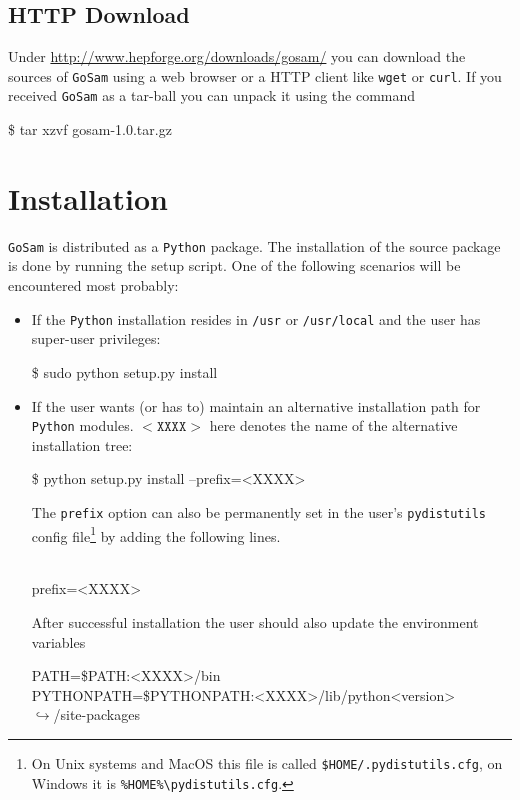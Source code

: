 \documentclass[11pt,a4paper]{refrep}
\newcommand{\golemversion}{{1{.}0}}
\newcommand{\golemv}[1][\golemversion]{{\tt GoSam}\xspace}
\newcommand{\packagename}{{gosam-\golemversion}}
\newcommand{\python}{{\tt Python}\xspace}
\newcommand{\contl}{{\ensuremath{\hookrightarrow}}}
\begin{document}
\subsection{HTTP Download}
Under \url{http://www.hepforge.org/downloads/gosam/}
you can download the sources of \golemv{} using a web browser or a
HTTP client like \texttt{wget} or \texttt{curl}.
If you received \golemv{} as a tar-ball you can unpack it using the command
\begin{example}
\$ tar xzvf \packagename{}.tar.gz
\end{example}

\section{Installation}
\golemv{} is distributed as a \python package.
The installation of the source package is done by running
the setup script. One of the following scenarios will be
encountered most probably:
\begin{itemize}
\item If the \python installation resides in \texttt{/usr} or
   \texttt{/usr/local}
   and the user has super-user privileges:
\begin{example}
\$ sudo python setup.py install
\end{example}

\item If the user wants (or has to) maintain an alternative installation
   path for \python modules. $\mathtt{<XXXX>}$ here denotes the name of the
   alternative installation tree:
\begin{example}
\$ python setup.py install --prefix=<XXXX>
\end{example}
   The \texttt{prefix} option can also be permanently set in the
   user's \texttt{pydistutils} config file\footnote{%
   On Unix systems and MacOS this file is called
   \texttt{\$HOME/.pydistutils.cfg}, on Windows it is
   \texttt{\%HOME\%\textbackslash{}pydistutils.cfg}.} by adding the
   following lines.
\begin{example}
[install]\\
prefix=<XXXX>
\end{example}
   After successful installation the user should also update the
   environment variables
\begin{example}
PATH=\$PATH:<XXXX>/bin\\
PYTHONPATH=\$PYTHONPATH:<XXXX>/lib/python<version>\\
\contl/site-packages
\end{example}
\end{itemize}
\end{document}
